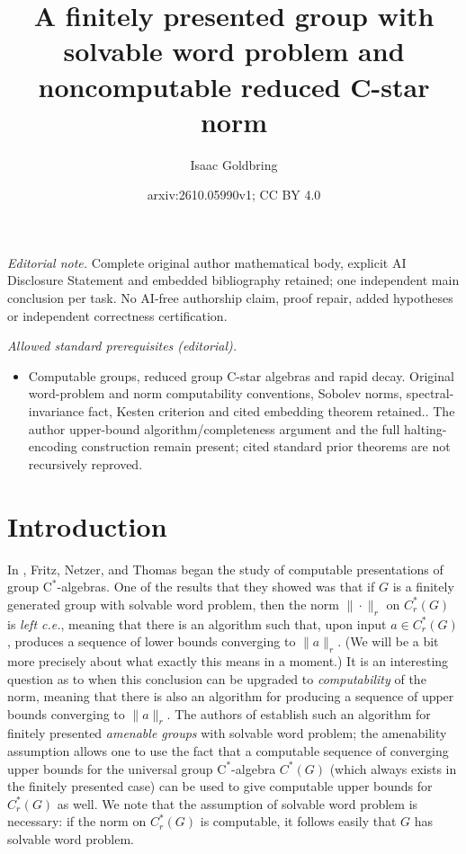 \documentclass[10pt,a4paper]{amsart}
\title{A finitely presented group with solvable word problem and noncomputable reduced C-star norm}
\author{Isaac Goldbring}
\date{arxiv:2610.05990v1; CC BY 4.0}
\newcommand{\cstar}{$\mathrm{C}^*$}
\theoremstyle{plain}
\theoremstyle{definition}
\numberwithin{equation}{section}
\begin{document}
\maketitle
\noindent\textit{Editorial note.} Complete original author mathematical body, explicit AI Disclosure Statement and embedded bibliography retained; one independent main conclusion per task. No AI-free authorship claim, proof repair, added hypotheses or independent correctness certification.\par\medskip
\noindent\textit{Allowed standard prerequisites (editorial).}\begin{itemize}
\item Computable groups, reduced group C-star algebras and rapid decay. Original word-problem and norm computability conventions, Sobolev norms, spectral-invariance fact, Kesten criterion and cited embedding theorem retained.. The author upper-bound algorithm/completeness argument and the full halting-encoding construction remain present; cited standard prior theorems are not recursively reproved.
\end{itemize}\medskip
\section{Introduction}\label{sec:Intro}

In \cite{canyou}, Fritz, Netzer, and Thomas began the study of computable presentations of group \cstar-algebras.  One of the results that they showed was that if $G$ is a finitely generated group with solvable word problem, then the norm $\|\cdot\|_r$ on $C^*_r(G)$ is \emph{left c.e.}, meaning that there is an algorithm such that, upon input $a\in C^*_r(G)$, produces a sequence of lower bounds converging to $\|a\|_r$.  (We will be a bit more precisely about what exactly this means in a moment.)  It is an interesting question as to when this conclusion can be upgraded to \emph{computability} of the norm, meaning that there is also an algorithm for producing a sequence of upper bounds converging to $\|a\|_r$.  The authors of \cite{canyou} establish such an algorithm for finitely presented \emph{amenable groups} with solvable word problem; the amenability assumption allows one to use the fact that a computable sequence of converging upper bounds for the universal group \cstar-algebra $C^*(G)$ (which always exists in the finitely presented case) can be used to give computable upper bounds for $C^*_r(G)$ as well.  We note that the assumption of solvable word problem is necessary:  if the norm on $C^*_r(G)$ is computable, it follows easily that $G$ has solvable word problem.  
\end{document}
